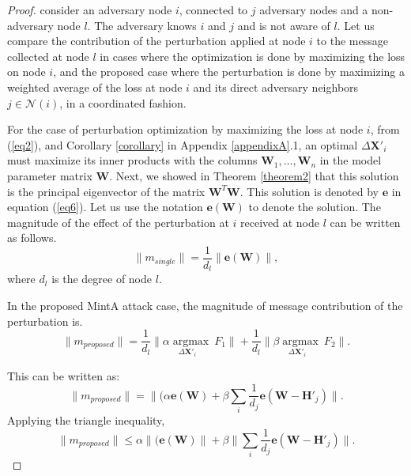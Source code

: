 \documentclass[conference,compsoc]{IEEEtran}
\begin{document}
\begin{proof}
\par consider an adversary node $i$, connected to $j$ adversary nodes and a non-adversary node $l$. The adversary knows $i$ and $j$ and is not aware of $l$. Let us compare the contribution of the perturbation applied at node $i$ to the message collected at node $l$ in cases where the optimization is done by maximizing the loss on node $i$, and the proposed case where the perturbation is done by maximizing a weighted average of the loss at node $i$ and its direct adversary neighbors $j \in \mathcal{N}(i)$, in a coordinated fashion.
\par For the case of perturbation optimization by maximizing the loss at node $i$, from (\ref{eq2}), and Corollary \ref{corollary} in Appendix \ref{appendixA}.1, an optimal $\Delta \boldsymbol{X'}_i$ must maximize its inner products with the columns $\boldsymbol{W}_1, \ldots, \boldsymbol{W}_n$ in the model parameter matrix $\boldsymbol{W}$. Next, we showed in Theorem \ref{theorem2} that this solution is the principal eigenvector of the matrix $\boldsymbol{W}^T\boldsymbol{W}$. This solution is denoted by $\boldsymbol{e}$ in equation (\ref{eq6}). Let us use the notation $\boldsymbol{e}(\boldsymbol{W})$ to denote the solution. The magnitude of the effect of the perturbation at $i$ received at node $l$ can be written as follows.
\begin{equation}
 \|m_{single}\|=\frac{1}{d_l} \|\boldsymbol{e}(\boldsymbol{W})\|,
\end{equation}
\noindent where $d_l$ is the degree of node $l$.
\par In the proposed MintA attack case, the magnitude of message contribution of the perturbation is.
\begin{equation}
 \|m_{proposed}\|=
 \frac{1}{d_l} \|\underset{\Delta \boldsymbol{X'}_i}{\alpha\operatorname{argmax}} ~ F_1\|
 +
 \frac{1}{d_l} \|\underset{\Delta \boldsymbol{X'}_i}{\beta \operatorname{argmax}}~F_2\|.
\end{equation}
\par This can be written as: 
\begin{equation}
 \|m_{proposed}\|=
 \|(\alpha\boldsymbol{e}(\boldsymbol{W})
 +
 \beta\sum_i\frac{1}{d_j}\boldsymbol{e}(\boldsymbol{W}-\boldsymbol{H'}_j)\|.
\end{equation}
\noindent Applying the triangle inequality,
\begin{equation}
 \|m_{proposed}\|\leq
 \alpha\|(\boldsymbol{e}(\boldsymbol{W})\|
 +
 \beta\|\sum_i\frac{1}{d_j}\boldsymbol{e}(\boldsymbol{W}-\boldsymbol{H'}_j)\|.
\end{equation}


\end{proof}
\end{document}
